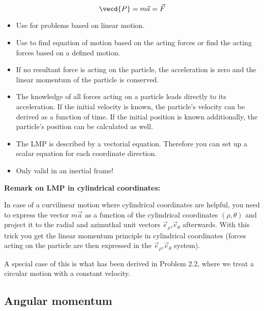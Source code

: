 \documentclass[10pt,a4paper]{scrartcl}
\begin{document}
\begin{multicols*}{2}
\begin{equation*}
\vecd{P} = m\vec{a} = \vec{F}
\end{equation*}


\begin{itemize}
\item Use for problems based on linear motion.
\item Use to find equation of motion based on the acting forces or find the acting forces based on a defined motion.
\item If no resultant force is acting on the particle, the acceleration is zero and the linear momentum of the particle is conserved.
\item The knowledge of all forces acting on a particle leads directly to its acceleration. If the initial velocity is known, the particle's velocity can be derived as a function of time. If the initial position is known additionally, the particle's position can be calculated as well.
\item The LMP is described by a vectorial equation. Therefore you can set up a scalar equation for each coordinate direction.
\item Only valid in an inertial frame!
\end{itemize}

\vspace{0.5cm}
\textbf{Remark on LMP in cylindrical coordinates:}

In case of a curvilinear motion where cylindrical coordinates are helpful, you need to express the vector $m \vec{a}$ as a function of the cylindrical coordinates $(\rho,\theta)$ and project it to the radial and azimuthal unit vectors $\vec{e}_\rho$,$\vec{e}_{\theta}$ afterwards. With this trick you get the linear momentum principle in cylindrical coordinates (forces acting on the particle are then expressed in the $\vec{e}_\rho$,$\vec{e}_{\theta}$ system).

A special case of this is what has been derived in Problem 2.2, where we treat a circular motion with a constant velocity.

\subsection{Angular momentum}


\end{multicols*}
\end{document}
